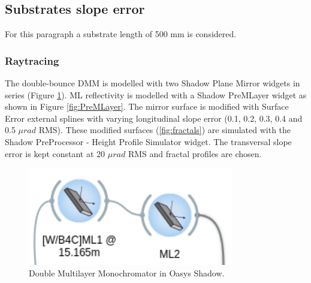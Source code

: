\subsection{Substrates slope error}
For this paragraph a substrate length of 500 mm is considered.

\subsubsection{Raytracing}
The double-bounce DMM is modelled with two Shadow Plane Mirror widgets in series (Figure \ref{fig:DMM_oasys}). ML reflectivity is modelled with a Shadow PreMLayer widget as shown in Figure \ref{fig:PreMLayer}. The mirror surface is modified with Surface Error external splines with varying longitudinal slope error (0.1, 0.2, 0.3, 0.4 and 0.5 $\mu rad$ RMS). These modified surfaces (\ref{fig:fractals}) are simulated with the Shadow PreProcessor - Height Profile Simulator widget. The transversal slope error is kept constant at 20 $\mu rad$ RMS and fractal profiles are chosen. 

\begin{figure}
\centering
\includegraphics[width=0.8\textwidth]{images/DMM_oasys.png}
\caption{\label{fig:DMM_oasys} Double Multilayer Monochromator in Oasys Shadow.}
\end{figure}

